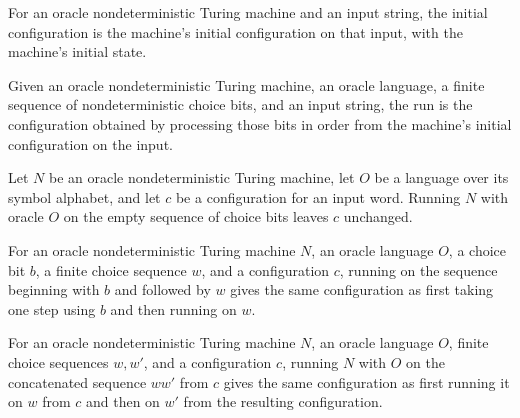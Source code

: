 \begin{definition}
\label{Turing.OracleNDTM.initCfg}
\leanok
{}
For an oracle nondeterministic Turing machine and an input string, the initial
configuration is the machine's initial configuration on that input, with the machine's
initial state.
\end{definition}

\begin{definition}
\label{Turing.OracleNDTM.runWith}
\leanok
{}
Given an oracle nondeterministic Turing machine, an oracle language, a finite sequence
of nondeterministic choice bits, and an input string, the run is the configuration
obtained by processing those bits in order from the machine's initial configuration on
the input.
\end{definition}

\begin{lemma}
\label{Turing.OracleNDTM.runWith_nil}
\leanok
{}
Let $N$ be an oracle nondeterministic Turing machine, let $O$ be a language over its
symbol alphabet, and let $c$ be a configuration for an input word. Running $N$ with
oracle $O$ on the empty sequence of choice bits leaves $c$ unchanged.
\end{lemma}

\begin{lemma}
\label{Turing.OracleNDTM.runWith_cons}
\leanok
{}
For an oracle nondeterministic Turing machine $N$, an oracle language $O$, a choice bit
$b$, a finite choice sequence $w$, and a configuration $c$, running on the sequence
beginning with $b$ and followed by $w$ gives the same configuration as first taking one
step using $b$ and then running on $w$.
\end{lemma}

\begin{lemma}
\label{Turing.OracleNDTM.runWith_append}
\leanok
{}
For an oracle nondeterministic Turing machine $N$, an oracle language $O$, finite choice
sequences $w,w'$, and a configuration $c$, running $N$ with $O$ on the concatenated
sequence $w w'$ from $c$ gives the same configuration as first running it on $w$ from
$c$ and then on $w'$ from the resulting configuration.
\end{lemma}

